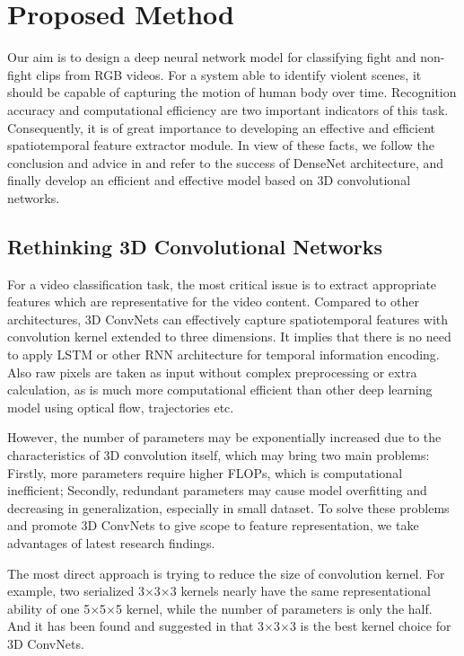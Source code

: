 \documentclass[10pt,twocolumn,letterpaper]{article}
\begin{document}

\section{Proposed Method}
Our aim is to design a deep neural network model for classifying fight and non-fight clips from RGB videos. 
For a system able to identify violent scenes, it should be capable of capturing the motion of human body over time. 
Recognition accuracy and computational efficiency are two important indicators of this task.
Consequently, it is of great importance to developing an effective and efficient spatiotemporal feature extractor module.
In view of these facts, we follow the conclusion and advice in \cite{3dcnn_1, r2+1d} and refer to the success of DenseNet \cite{densenet} architecture, and finally develop an efficient and effective model based on 3D convolutional networks.


\subsection{Rethinking 3D Convolutional Networks}

For a video classification task, the most critical issue is to extract appropriate features which are representative for the video content.
Compared to other architectures, 3D ConvNets can effectively capture spatiotemporal features  with convolution kernel extended to three dimensions. 
It implies that there is no need to apply LSTM or other RNN architecture for temporal information encoding. 
Also raw pixels are taken as input without complex preprocessing or extra calculation, as is much more computational efficient than other deep learning model using optical flow, trajectories etc.

However, the number of parameters may be exponentially increased due to the characteristics of 3D convolution itself, which may bring two main problems: 
Firstly, more parameters require higher FLOPs, which is computational inefficient; 
Secondly, redundant parameters may cause model overfitting and decreasing in generalization, especially in small dataset. 
To solve these problems and promote 3D ConvNets to give scope to feature representation, we take advantages of latest research findings.

The most direct approach is trying to reduce the size of convolution kernel. For example, two serialized 3$\times$3$\times$3 kernels nearly have the same representational ability of one 5$\times$5$\times$5 kernel, while the number of parameters is only the half. And it has been found and suggested in \cite{3dcnn_1} that 3$\times$3$\times$3 is the best kernel choice for 3D ConvNets.
\end{document}
